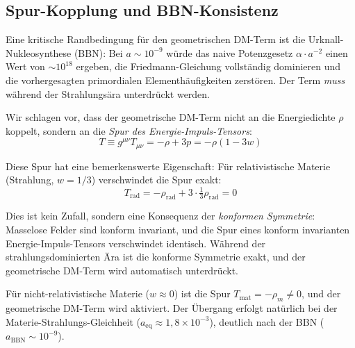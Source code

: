 \documentclass[aps,prd,twocolumn,superscriptaddress,nofootinbib,floatfix]{revtex4-2}
\begin{document}
\subsection{Spur-Kopplung und BBN-Konsistenz}
\label{subsec:trace_coupling}

Eine kritische Randbedingung für den geometrischen DM-Term ist die Urknall-Nukleosynthese (BBN): Bei $a \sim 10^{-9}$ würde das naive Potenzgesetz $\alpha \cdot a^{-2}$ einen Wert von $\sim 10^{18}$ ergeben, die Friedmann-Gleichung vollständig dominieren und die vorhergesagten primordialen Elementhäufigkeiten zerstören. Der Term \textit{muss} während der Strahlungsära unterdrückt werden.

Wir schlagen vor, dass der geometrische DM-Term nicht an die Energiedichte $\rho$ koppelt, sondern an die \textit{Spur des Energie-Impuls-Tensors}:
\begin{equation}
T \equiv g^{\mu\nu} T_{\mu\nu} = -\rho + 3p = -\rho(1 - 3w)
\end{equation}

Diese Spur hat eine bemerkenswerte Eigenschaft: Für relativistische Materie (Strahlung, $w = 1/3$) verschwindet die Spur exakt:
\begin{equation}
T_{\mathrm{rad}} = -\rho_{\mathrm{rad}} + 3 \cdot \tfrac{1}{3}\rho_{\mathrm{rad}} = 0
\end{equation}

Dies ist kein Zufall, sondern eine Konsequenz der \textit{konformen Symmetrie}: Masselose Felder sind konform invariant, und die Spur eines konform invarianten Energie-Impuls-Tensors verschwindet identisch. Während der strahlungsdominierten Ära ist die konforme Symmetrie exakt, und der geometrische DM-Term wird automatisch unterdrückt.

Für nicht-relativistische Materie ($w \approx 0$) ist die Spur $T_{\mathrm{mat}} = -\rho_m \neq 0$, und der geometrische DM-Term wird aktiviert. Der Übergang erfolgt natürlich bei der Materie-Strahlungs-Gleichheit ($a_{\mathrm{eq}} \approx 1{,}8 \times 10^{-3}$), deutlich nach der BBN ($a_{\mathrm{BBN}} \sim 10^{-9}$).
\end{document}

